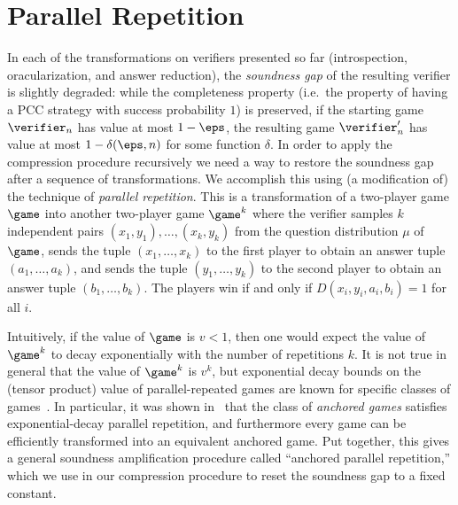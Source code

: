\section{Parallel Repetition}
\label{sec:parrep}

\def\tvanch{\hat{\verifier}^\anch}
\def\tdanch{\hat{\decider}^\anch}
\def\tsanch{\hat{\sampler}^\anch}
\def\vanch{\verifier^\anch}
\def\danch{\decider^\anch}
\def\sanch{\sampler^\anch}

In each of the transformations on verifiers presented so far (introspection,
oracularization, and answer reduction), the \emph{soundness gap} of the
resulting verifier is slightly degraded: while the completeness property (i.e.\
the property of having a PCC strategy with success probability $1$) is
preserved, if the starting game $\verifier_n$ has value at most $1 - \eps$, the
resulting game $\verifier_n'$ has value at most $1 - \delta(\eps, n)$ for some
function $\delta$.
In order to apply the compression procedure recursively we need a way to restore
the soundness gap after a sequence of transformations.
We accomplish this using (a modification of) the technique of \emph{parallel
  repetition}.
  This is a transformation of a two-player game $\game$ into another two-player game $\game^k$
  where the verifier samples $k$ independent pairs $(x_1,y_1),\ldots,(x_k,y_k)$ from the
  question distribution $\mu$ of $\game$, sends the tuple $(x_1,\ldots,x_k)$ to the first player
  to obtain an answer tuple $(a_1,\ldots,a_k)$, and sends the tuple $(y_1,\ldots,y_k)$ to the second
  player to obtain an answer tuple $(b_1,\ldots,b_k)$. The players win if and only if $D(x_i,y_i,a_i,b_i) = 1$ 
  for all $i$.  


Intuitively, if the value of $\game$ is $v < 1$, then one would expect the value
of $\game^k$ to decay exponentially with the number of repetitions $k$.
It is not true in general that the value of $\game^k$ is $v^k$, but exponential
decay bounds on the (tensor product) value of parallel-repeated games are known
for specific classes of
games~\cite{jain2014parallel,dinur2015parallel,bavarian2017hardness}.
In particular, it was shown in~\cite{bavarian2017hardness} that the class of
\emph{anchored games} satisfies exponential-decay parallel repetition, and
furthermore every game can be efficiently transformed into an equivalent
anchored game. 
Put together, this gives a general soundness amplification procedure called
``anchored parallel repetition,'' which we use in our compression procedure to
reset the soundness gap to a fixed constant.

